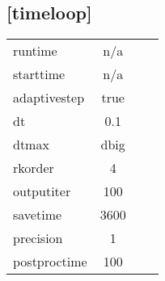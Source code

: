 \documentclass[a4paper,10pt]{extarticle}
\begin{document}
\subsection*{[timeloop]}
\tablelasttail{\hline}
\begin{supertabular}{lccl}
runtime       & n/a   & \\
starttime     & n/a   & \\
adaptivestep  & true  & \\
dt            & 0.1   & \\
dtmax         & dbig  & \\
rkorder       & 4     & \\
outputiter    & 100   & \\
savetime      & 3600  & \\
precision     & 1     & \\
postproctime  & 100   & \\
\end{supertabular}
\end{document}
